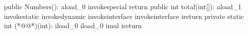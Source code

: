 
\begin{ffcode}
public Numbers():
 aload_0
 invokespecial
 return
public int
  total(int[]):
 aload_1
 invokestatic
 invokedynamic
 invokeinterface
 invokeinterface
 ireturn
private static int
  (*@@*)(int):
 iload_0
 iload_0
 imul
 ireturn
\end{ffcode}
